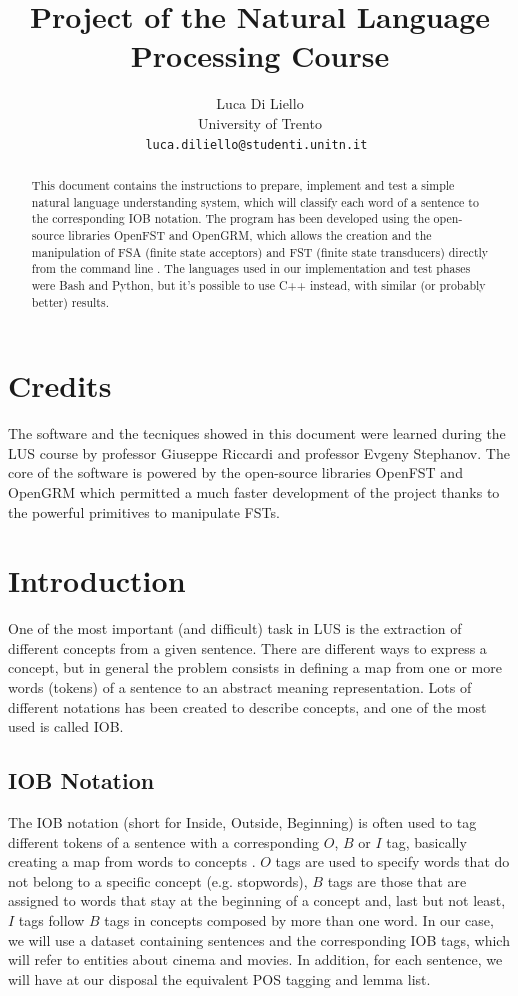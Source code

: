 \documentclass[11pt,a4paper]{article}
\title{Project of the Natural Language Processing Course}
\author{Luca Di Liello \\
	University of Trento\\
	{\tt luca.diliello@studenti.unitn.it }
}
\begin{document}
\maketitle

\begin{abstract}

This document contains the instructions to prepare, implement and test a simple natural language understanding system, which will classify each word of a sentence to the corresponding IOB notation. The program has been developed using the open-source libraries OpenFST and OpenGRM, which allows the creation and the manipulation of FSA (finite state acceptors) and FST (finite state transducers) directly from the command line \cite{openfst} \cite{opengrm}. The languages used in our implementation and test phases were Bash and Python, but it's possible to use C++ instead, with similar (or probably better) results.

\end{abstract}

\section{Credits}

The software and the tecniques showed in this document were learned during the LUS course by professor Giuseppe Riccardi and professor Evgeny Stephanov. The core of the software is powered by the open-source libraries OpenFST and OpenGRM which permitted a much faster development of the project thanks to the powerful primitives to manipulate FSTs.

\section{Introduction}

One of the most important (and difficult) task in LUS is the extraction of different concepts from a given sentence. There are different ways to express a concept, but in general the problem consists in defining a map from one or more words (tokens) of a sentence to an abstract meaning representation. Lots of different notations has been created to describe concepts, and one of the most used is called IOB.

\subsection{IOB Notation}

The IOB notation (short for Inside, Outside, Beginning) is often used to tag different tokens of a sentence with a corresponding $O$, $B$ or $I$ tag, basically creating a map from words to concepts \cite{iob_notation}. $O$ tags are used to specify words that do not belong to a specific concept (e.g. stopwords), $B$ tags are those that are assigned to words that stay at the beginning of a concept and, last but not least, $I$ tags follow $B$ tags in concepts composed by more than one word. In our case, we will use a dataset containing sentences and the corresponding IOB tags, which will refer to entities about cinema and movies. In addition, for each sentence, we will have at our disposal the equivalent POS tagging and lemma list.
\end{document}
